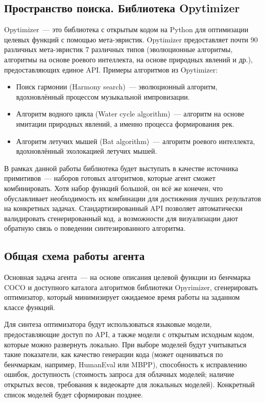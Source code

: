 \documentclass[a4paper,14pt]{extarticle}
\begin{document}
\subsection{Пространство поиска. Библиотека Opytimizer}
    Opytimizer~--- это библиотека с открытым кодом на Python для оптимизации целевых функций с помощью мета-эвристик.
    Opytimizer предоставляет почти 90 различных мета-эвристик 7 различных типов (эволюционные алгоритмы, алгоритмы на основе роевого интеллекта, на основе природных явлений и др.), предоставляющих единое API.
    Примеры алгоритмов из Opytimizer:
    \begin{itemize}
        \item Поиск гармонии (Harmony search)~--- эволюционный алгоритм, вдохновлённый процессом музыкальной импровизации.
        \item Алгоритм водного цикла (Water cycle algorithm)~--- алгоритм на основе имитации природных явлений, а именно  процесса формирования рек.
        \item Алгоритм летучих мышей (Bat algorithm)~--- алгоритм роевого интеллекта, вдохновлённый эхолокацией летучих мышей.
    \end{itemize}

    В рамках данной работы библиотека будет выступать в качестве источника примитивов~--- наборов готовых алгоритмов, которые агент сможет комбинировать.
    Хотя набор функций большой, он всё же конечен, что обуславливает необходимость их комбинации для достижения лучших результатов на конкретных задачах.
    Стандартизированный API позволяет автоматически валидировать сгенерированный код, а возможности для визуализации дают обратную связь о поведении синтезированного алгоритма.
    
\subsection{Общая схема работы агента}
    Основная задача агента~--- на основе описания целевой функции из бенчмарка COCO и доступного каталога алгоритмов библиотеки Opyrimizer, сгенерировать оптимизатор, который минимизирует ожидаемое время работы на заданном классе функций.

    Для синтеза оптимизатора будут использоваться языковые модели, предоставляющие доступ по API, а также модели с открытым исходным кодом, которые можно развернуть локально.
    При выборе моделей будут учитываться такие показатели, как качество генерации кода (может оцениваться по бенчмаркам, например, HumanEval или MBPP), способность к исправлению ошибок, доступность (стоимость запроса для облачных моделей; наличие открытых весов, требования к видеокарте для локальных моделей).
    Конкретный список моделей будет сформирован позднее.
    
\end{document}
